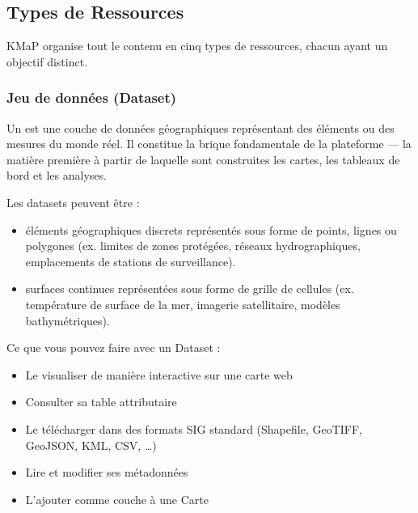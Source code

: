 \documentclass[letterpaper,10pt,english]{sphinxmanual}
\begin{document}
\subsection{Types de Ressources}
\label{\detokenize{fr/01_bienvenue:types-de-ressources}}
\sphinxAtStartPar
KMaP organise tout le contenu en cinq types de ressources, chacun ayant un objectif
distinct.


\subsubsection{Jeu de données (Dataset)}
\label{\detokenize{fr/01_bienvenue:jeu-de-donnees-dataset}}
\sphinxAtStartPar
Un  est une couche de données géographiques représentant des éléments ou
des mesures du monde réel. Il constitue la brique fondamentale de la plateforme —
la matière première à partir de laquelle sont construites les cartes, les tableaux de
bord et les analyses.

\sphinxAtStartPar
Les datasets peuvent être :
\begin{itemize}
\item {} 
\sphinxAtStartPar
{} \textendash{} éléments géographiques discrets représentés sous forme de points,
lignes ou polygones (ex. limites de zones protégées, réseaux hydrographiques,
emplacements de stations de surveillance).

\item {} 
\sphinxAtStartPar
{} \textendash{} surfaces continues représentées sous forme de grille de cellules
(ex. température de surface de la mer, imagerie satellitaire, modèles bathymétriques).

\end{itemize}

\sphinxAtStartPar
Ce que vous pouvez faire avec un Dataset :
\begin{itemize}
\item {} 
\sphinxAtStartPar
Le visualiser de manière interactive sur une carte web

\item {} 
\sphinxAtStartPar
Consulter sa table attributaire

\item {} 
\sphinxAtStartPar
Le télécharger dans des formats SIG standard (Shapefile, GeoTIFF, GeoJSON, KML, CSV, …)

\item {} 
\sphinxAtStartPar
Lire et modifier ses métadonnées

\item {} 
\sphinxAtStartPar
L’ajouter comme couche à une Carte

\end{itemize}
\end{document}
